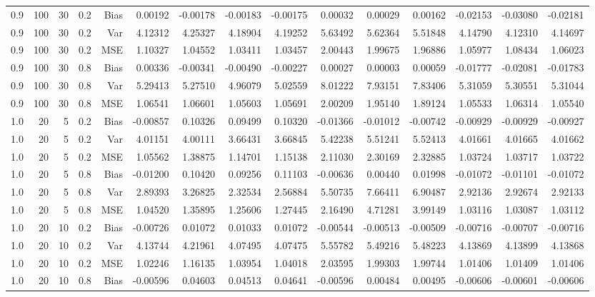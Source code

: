 \begin{table}[!htbp]
\begin{tabular}{lrrrrrrrrrrrrrr}
0.9 & 100 & 30 & 0.2 & Bias & 0.00192 & -0.00178 & -0.00183 & -0.00175 & 0.00032 & 0.00029 & 0.00162 & -0.02153 & -0.03080 & -0.02181 \\
0.9 & 100 & 30 & 0.2 & Var & 4.12312 & 4.25327 & 4.18904 & 4.19252 & 5.63492 & 5.62364 & 5.51848 & 4.14790 & 4.12310 & 4.14697 \\
0.9 & 100 & 30 & 0.2 & MSE & 1.10327 & 1.04552 & 1.03411 & 1.03457 & 2.00443 & 1.99675 & 1.96886 & 1.05977 & 1.08434 & 1.06023 \\
0.9 & 100 & 30 & 0.8 & Bias & 0.00336 & -0.00341 & -0.00490 & -0.00227 & 0.00027 & 0.00003 & 0.00059 & -0.01777 & -0.02081 & -0.01783 \\
0.9 & 100 & 30 & 0.8 & Var & 5.29413 & 5.27510 & 4.96079 & 5.02559 & 8.01222 & 7.93151 & 7.83406 & 5.31059 & 5.30551 & 5.31044 \\
0.9 & 100 & 30 & 0.8 & MSE & 1.06541 & 1.06601 & 1.05603 & 1.05691 & 2.00209 & 1.95140 & 1.89124 & 1.05533 & 1.06314 & 1.05540 \\
1.0 &  20 &  5 & 0.2 & Bias & -0.00857 & 0.10326 & 0.09499 & 0.10320 & -0.01366 & -0.01012 & -0.00742 & -0.00929 & -0.00929 & -0.00927 \\
1.0 &  20 &  5 & 0.2 & Var & 4.01151 & 4.00111 & 3.66431 & 3.66845 & 5.42238 & 5.51241 & 5.52413 & 4.01661 & 4.01665 & 4.01662 \\
1.0 &  20 &  5 & 0.2 & MSE & 1.05562 & 1.38875 & 1.14701 & 1.15138 & 2.11030 & 2.30169 & 2.32885 & 1.03724 & 1.03717 & 1.03722 \\
1.0 &  20 &  5 & 0.8 & Bias & -0.01200 & 0.10420 & 0.09256 & 0.11103 & -0.00636 & 0.00440 & 0.01998 & -0.01072 & -0.01101 & -0.01072 \\
1.0 &  20 &  5 & 0.8 & Var & 2.89393 & 3.26825 & 2.32534 & 2.56884 & 5.50735 & 7.66411 & 6.90487 & 2.92136 & 2.92674 & 2.92133 \\
1.0 &  20 &  5 & 0.8 & MSE & 1.04520 & 1.35895 & 1.25606 & 1.27445 & 2.16490 & 4.71281 & 3.99149 & 1.03116 & 1.03087 & 1.03112 \\
1.0 &  20 & 10 & 0.2 & Bias & -0.00726 & 0.01072 & 0.01033 & 0.01072 & -0.00544 & -0.00513 & -0.00509 & -0.00716 & -0.00707 & -0.00716 \\
1.0 &  20 & 10 & 0.2 & Var & 4.13744 & 4.21961 & 4.07495 & 4.07475 & 5.55782 & 5.49216 & 5.48223 & 4.13869 & 4.13899 & 4.13868 \\
1.0 &  20 & 10 & 0.2 & MSE & 1.02246 & 1.16135 & 1.03954 & 1.04018 & 2.03595 & 1.99303 & 1.99744 & 1.01406 & 1.01409 & 1.01406 \\
1.0 &  20 & 10 & 0.8 & Bias & -0.00596 & 0.04603 & 0.04513 & 0.04641 & -0.00596 & 0.00484 & 0.00495 & -0.00606 & -0.00601 & -0.00606 \\

\end{tabular}
\end{table}

